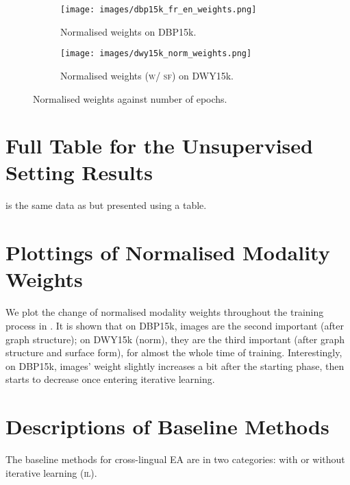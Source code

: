 \documentclass[letterpaper]{article} \usepackage{aaai21}  \usepackage{times}  \usepackage{helvet} \usepackage{courier}  \usepackage[hyphens]{url}  \usepackage{graphicx} \urlstyle{rm} \def\UrlFont{\rm}  \usepackage{natbib}  \usepackage{caption} \frenchspacing  \setlength{\pdfpagewidth}{8.5in}  \setlength{\pdfpageheight}{11in}
\begin{document}
 \begin{figure*}[!ht]
     \centering
     \begin{subfigure}{0.48\linewidth}
     \texttt{[image: images/dbp15k\_fr\_en\_weights.png]}
     \caption{Normalised weights on DBP15k.}
     \end{subfigure}
\begin{subfigure}{0.48\linewidth}
      \texttt{[image: images/dwy15k\_norm\_weights.png]}
      \caption{Normalised weights (\textsc{w/ sf}) on DWY15k.}
     \end{subfigure}   
     \caption{Normalised weights against number of epochs.}
     \label{fig:weights}
 \end{figure*}



\section{Full Table for the Unsupervised Setting Results}\label{sup:unsup_table}

 is the same data as  but presented using a table.




\section{Plottings of Normalised Modality Weights}\label{sup:modality_weights}


We plot the change of normalised modality weights throughout the training process in . It is shown that on DBP15k, images are the second important (after graph structure); on DWY15k (norm), they are the third important (after graph structure and surface form), for almost the whole time of training. Interestingly, on DBP15k, images' weight slightly increases a bit after the starting phase, then starts to decrease once entering iterative learning.



\section{Descriptions of Baseline Methods}\label{sup:baseline}

The baseline methods for cross-lingual EA are in two categories: with or without iterative learning (\textsc{il}). 
\end{document}
